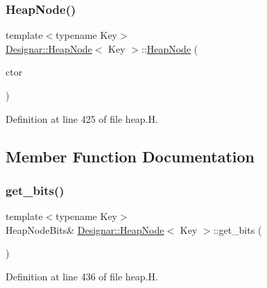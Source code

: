 \subsubsection{\texorpdfstring{Heap\+Node()}{HeapNode()}\hspace{0.1cm}{\footnotesize\ttfamily [4/4]}}
{\footnotesize\ttfamily template$<$typename Key$>$ \\
\hyperlink{class_designar_1_1_heap_node}{Designar\+::\+Heap\+Node}$<$ Key $>$\+::\hyperlink{class_designar_1_1_heap_node}{Heap\+Node} (\begin{DoxyParamCaption}\item[{\hyperlink{namespace_designar_a679bc99fd69a3601faa5d6d47f865106}{Bin\+Tree\+Node\+Ctor}}]{ctor }\end{DoxyParamCaption})\hspace{0.3cm}{\ttfamily [inline]}}



Definition at line 425 of file heap.\+H.



\subsection{Member Function Documentation}
\mbox{\label{class_designar_1_1_heap_node_a9fc6866e2550f415ec407b1c85ca54ab}} 
\subsubsection{\texorpdfstring{get\+\_\+bits()}{get\_bits()}}
{\footnotesize\ttfamily template$<$typename Key$>$ \\
Heap\+Node\+Bits\& \hyperlink{class_designar_1_1_heap_node}{Designar\+::\+Heap\+Node}$<$ Key $>$\+::get\+\_\+bits (\begin{DoxyParamCaption}{ }\end{DoxyParamCaption})\hspace{0.3cm}{\ttfamily [inline]}}



Definition at line 436 of file heap.\+H.

\mbox{\label{class_designar_1_1_heap_node_aacf1d59ac7645a1fe6479f93957dc1be}} 
